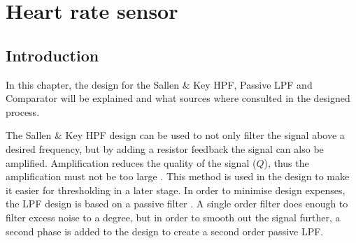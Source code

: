 \chapter{Heart rate sensor}\label{ch:heartRate}

\section{Introduction} \label{sec:heartIntro}
In this chapter, the design for the Sallen \& Key HPF, Passive LPF and Comparator will be explained and what sources where consulted in the designed process.\par
The Sallen \& Key HPF design \cite{Sallen} can be used to not only filter the signal above a desired frequency, but by adding a resistor feedback the signal can also be amplified. Amplification reduces the quality of the signal ($Q$), thus the amplification must not be too large . This method is used in the design to make it easier for thresholding in a later stage. In order to minimise design expenses, the LPF design is based on a passive filter \cite{LPF}. A single order filter does enough to filter excess noise to a degree, but in order to smooth out the signal further, a second phase is added to the design to create a second order passive LPF. 



